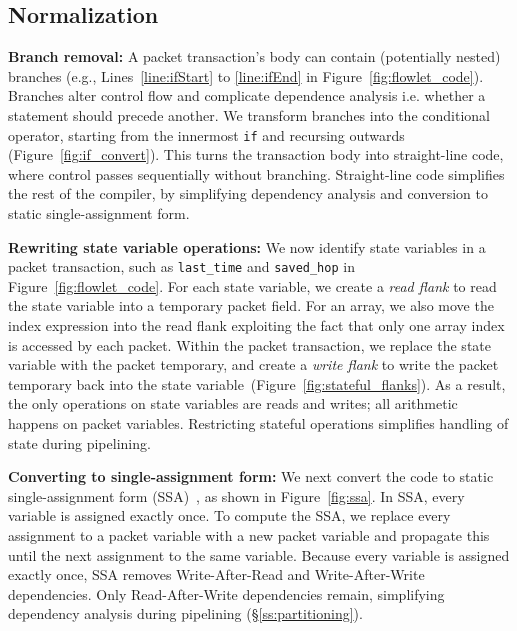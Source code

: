 \subsection{Normalization}
\label{ss:normalization}


\textbf{Branch removal: }A packet transaction's body can contain
(potentially nested) branches (e.g., Lines~\ref{line:ifStart} to
\ref{line:ifEnd} in Figure~\ref{fig:flowlet_code}).  Branches alter
control flow and complicate dependence analysis i.e.  whether a
statement should precede another.  We transform branches into the
conditional operator, starting from the innermost \texttt{if} and
recursing outwards (Figure~\ref{fig:if_convert}).  This turns the
transaction body into straight-line code, where control passes
sequentially without branching.  Straight-line code simplifies the
rest of the compiler, by simplifying dependency analysis and
conversion to static single-assignment form.

\textbf{Rewriting state variable operations: }We now identify state variables
in a packet transaction, such as \texttt{last\_time} and \texttt{saved\_hop} in
Figure~\ref{fig:flowlet_code}.  For each state variable, we create a
\textit{read flank} to read the state variable into a temporary packet field.
For an array, we also move the index expression into the read flank exploiting
the fact that only one array index is accessed by each packet.  Within the
packet transaction, we replace the state variable with the packet temporary,
and create a \textit{write flank} to write the packet temporary back into the
state variable~(Figure~\ref{fig:stateful_flanks}). As a result, the only
operations on state variables are reads and writes; all arithmetic happens on
packet variables. Restricting stateful operations simplifies handling of state
during pipelining.

\textbf{Converting to single-assignment form: }We next convert the
code to static single-assignment form (SSA)~\cite{ssa}, as shown in
Figure~\ref{fig:ssa}. In SSA, every variable is assigned exactly
once. To compute the SSA, we replace every assignment to a packet
variable with a new packet variable and propagate this until the next
assignment to the same variable.  Because every variable is assigned
exactly once, SSA removes Write-After-Read and Write-After-Write
dependencies.  Only Read-After-Write dependencies remain, simplifying
dependency analysis during pipelining (\S\ref{ss:partitioning}).


